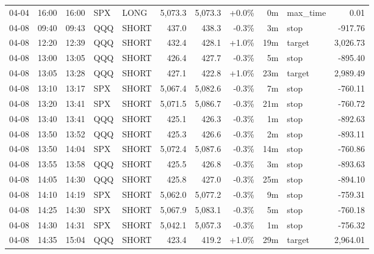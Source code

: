 \documentclass[11pt,a4paper,twoside]{article}
\begin{document}
\begin{center}
\begin{longtable}{>{\color{txtmain}}l l l l l r r r r >{\color{txtmain}}l r}
04-04 & 16:00 & 16:00 & SPX & LONG & 5,073.3 & 5,073.3 & \textcolor{wingreen}{+0.0\%} & 0m & max\_time & \textcolor{wingreen}{0.01} \\
04-08 & 09:40 & 09:43 & QQQ & SHORT & 437.0 & 438.3 & \textcolor{lossred}{-0.3\%} & 3m & stop & \textcolor{lossred}{-917.76} \\
04-08 & 12:20 & 12:39 & QQQ & SHORT & 432.4 & 428.1 & \textcolor{wingreen}{+1.0\%} & 19m & target & \textcolor{wingreen}{3,026.73} \\
04-08 & 13:00 & 13:05 & QQQ & SHORT & 426.4 & 427.7 & \textcolor{lossred}{-0.3\%} & 5m & stop & \textcolor{lossred}{-895.40} \\
04-08 & 13:05 & 13:28 & QQQ & SHORT & 427.1 & 422.8 & \textcolor{wingreen}{+1.0\%} & 23m & target & \textcolor{wingreen}{2,989.49} \\
04-08 & 13:10 & 13:17 & SPX & SHORT & 5,067.4 & 5,082.6 & \textcolor{lossred}{-0.3\%} & 7m & stop & \textcolor{lossred}{-760.11} \\
04-08 & 13:20 & 13:41 & SPX & SHORT & 5,071.5 & 5,086.7 & \textcolor{lossred}{-0.3\%} & 21m & stop & \textcolor{lossred}{-760.72} \\
04-08 & 13:40 & 13:41 & QQQ & SHORT & 425.1 & 426.3 & \textcolor{lossred}{-0.3\%} & 1m & stop & \textcolor{lossred}{-892.63} \\
04-08 & 13:50 & 13:52 & QQQ & SHORT & 425.3 & 426.6 & \textcolor{lossred}{-0.3\%} & 2m & stop & \textcolor{lossred}{-893.11} \\
04-08 & 13:50 & 14:04 & SPX & SHORT & 5,072.4 & 5,087.6 & \textcolor{lossred}{-0.3\%} & 14m & stop & \textcolor{lossred}{-760.86} \\
04-08 & 13:55 & 13:58 & QQQ & SHORT & 425.5 & 426.8 & \textcolor{lossred}{-0.3\%} & 3m & stop & \textcolor{lossred}{-893.63} \\
04-08 & 14:05 & 14:30 & QQQ & SHORT & 425.8 & 427.0 & \textcolor{lossred}{-0.3\%} & 25m & stop & \textcolor{lossred}{-894.10} \\
04-08 & 14:10 & 14:19 & SPX & SHORT & 5,062.0 & 5,077.2 & \textcolor{lossred}{-0.3\%} & 9m & stop & \textcolor{lossred}{-759.31} \\
04-08 & 14:25 & 14:30 & SPX & SHORT & 5,067.9 & 5,083.1 & \textcolor{lossred}{-0.3\%} & 5m & stop & \textcolor{lossred}{-760.18} \\
04-08 & 14:30 & 14:31 & SPX & SHORT & 5,042.1 & 5,057.3 & \textcolor{lossred}{-0.3\%} & 1m & stop & \textcolor{lossred}{-756.32} \\
04-08 & 14:35 & 15:04 & QQQ & SHORT & 423.4 & 419.2 & \textcolor{wingreen}{+1.0\%} & 29m & target & \textcolor{wingreen}{2,964.01} \\

\end{longtable}
\end{center}
\end{document}
